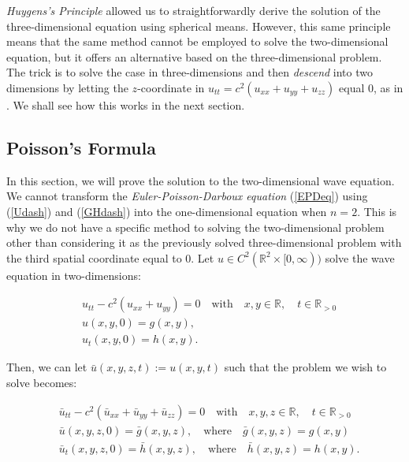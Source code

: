 \documentclass[a4paper, 12pt]{article}
\numberwithin{equation}{section}
\begin{document}
\emph{Huygens's Principle} allowed us to straightforwardly derive the solution of the three-dimensional equation using spherical means. However, this same principle
means that the same method cannot be employed to solve the two-dimensional equation, but it offers an alternative based on the three-dimensional problem. The trick is
to solve the case in three-dimensions and then \emph{descend} into two dimensions by letting the $z$-coordinate in $u_{tt}=c^2(u_{xx}+u_{yy}+u_{zz})$ equal $0$, as in \cite{Ev}. We shall see how this works in the 
next section. 

\subsection{Poisson's Formula}

In this section, we will prove the solution to the two-dimensional wave equation. We cannot transform the \emph{Euler-Poisson-Darboux equation} (\ref{EPDeq}) using (\ref{Udash}) and (\ref{GHdash}) 
into the one-dimensional equation when $n=2$. This is why we do not have a specific method to solving the two-dimensional problem other than considering it as the previously solved three-dimensional problem
with the third spatial coordinate equal to $0$. Let $u \in C^2(\mathbb{R}^2 \times [0, \infty))$ solve the wave equation in two-dimensions:

\begin{equation} \label{2d}
    \begin{aligned}
        &u_{tt}-c^2(u_{xx}+u_{yy})=0 \quad \textrm{with} \quad x,y \in \mathbb{R}, \quad t\in \mathbb{R}_{>0}\\
        &u(x, y, 0)=g(x,y),\\
        &u_t(x,y,0)=h(x,y).
    \end{aligned}
\end{equation}

Then, we can let $\bar{u}(x, y, z, t):=u(x, y, t)$ such that the problem we wish to solve becomes:

\begin{equation} \label{2das3d}
    \begin{aligned}
        &\bar{u}_{tt}-c^2(\bar{u}_{xx}+\bar{u}_{yy}+\bar{u}_{zz})=0 \quad \textrm{with} \quad x,y,z \in \mathbb{R}, \quad t\in \mathbb{R}_{>0}\\
        &\bar{u}(x, y, z, 0)=\bar{g}(x,y,z), \quad \textrm{where} \quad \bar{g}(x,y,z)=g(x,y)\\
        &\bar{u}_t(x,y,z,0)=\bar{h}(x,y,z), \quad \textrm{where} \quad \bar{h}(x,y,z)=h(x,y).
    \end{aligned}
\end{equation}
\end{document}
